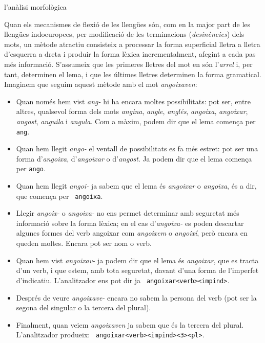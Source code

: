 \begin{persabermes}{l'anàlisi morfològica}

  Quan els mecanismes de flexió de les llengües són, com en la major
  part de les llengües indoeuropees, per modificació de les
  terminacions (\emph{desi\-nèn\-cies}) dels mots, un mètode atractiu
  consisteix a processar la forma superficial lletra a lletra
  d'esquerra a dreta i produir la forma lèxica incrementalment,
  afegint a cada pas més informació. S'assumeix que les primeres
  lletres del mot en són l'\emph{arrel} i, per tant, determinen el
  lema, i que les últimes lletres determinen la forma
  gramatical. Imaginem que seguim aquest mètode amb el mot
  \emph{angoixaven}:
\begin{itemize}
\item Quan només hem vist \emph{ang-} hi ha encara moltes
  possibilitats: pot ser, entre altres, qualsevol forma dels mots
  \emph{angina}, \emph{angle}, \emph{anglés}, \emph{angoixa},
  \emph{angoixar}, \emph{angost}, {\em anguila} i \emph{angula}. Com a
  màxim, podem dir que el lema comença per {\tt ang}.
\item Quan hem llegit \emph{ango-} el ventall de possibilitats es fa
  més estret: pot ser una forma d'\emph{angoixa}, d'\emph{angoixar} o
  d'\emph{angost}. Ja podem dir que el lema comença per {\tt ango}.
\item Quan hem llegit \emph{angoi-} ja sabem que el lema és
  \emph{angoixar} o \emph{angoixa}, és a dir, que comença per {\tt
    angoixa}.
\item Llegir \emph{angoix-} o \emph{angoixa-} no ens permet determinar
  amb seguretat més informació sobre la forma lèxica; en el cas
  d'\emph{angoixa-} es poden descartar algunes formes del verb
  angoixar com \emph{angoixem} o \emph{angoixí}, però encara en queden
  moltes. Encara pot ser nom o verb.
\item Quan hem vist \emph{angoixav-} ja podem dir que el lema és
  \emph{angoixar}, que es tracta d'un verb, i que estem, amb tota
  seguretat, davant d'una forma de l'imperfet
  d'indicatiu. L'analitzador ens pot dir ja {\tt
    angoixar<verb>\-<impind>}.
\item Després de veure \emph{angoixave-} encara no sabem la persona
  del verb (pot ser la segona del singular o la tercera del plural).
\item Finalment, quan veiem \emph{angoixaven} ja sabem que és la
  tercera del plural. L'analitzador produeix: {\tt
    angoixar<verb><impind><3><pl>}.
\end{itemize}

\end{persabermes}
